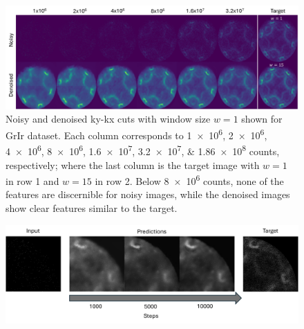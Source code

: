 \begin{figure}[h]
    \centering
    \includegraphics[width=1\linewidth]{images/images_noisy_denoised_with_target.pdf}
    \caption{Noisy and denoised \gls{ky}-\gls{kx} cuts with window size $w=1$ shown for \gls{GrIr} dataset. Each column corresponds to \numlist{1e6;2e6;4e6;8e6;1.6e7;3.2e7;1.86e8} counts, respectively; where the last column is the target image with $w=1$ in row 1 and $w=15$ in row 2. Below \num{8e6} counts, none of the features are discernible for noisy images, while the denoised images show clear features similar to the target.}
    \label{fig:images-noisy-denoised-training}
\end{figure}


\begin{figure}[h]
    \centering
    \includegraphics[width=1\linewidth]{images/training_progress_example2.pdf}
    \caption{}
    \label{fig:training-progress-example}
\end{figure}


